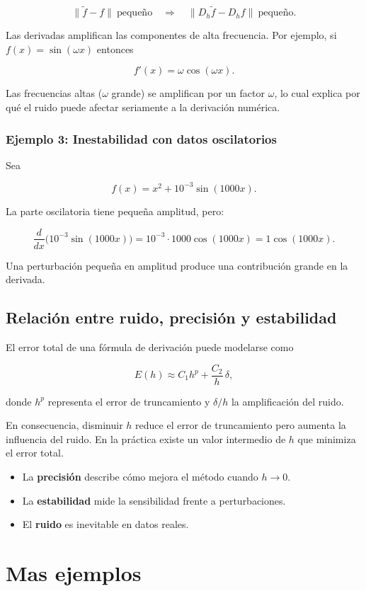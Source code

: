 \documentclass[12pt,a4paper]{article}
\theoremstyle{definition}
\theoremstyle{remark}
\begin{document}
\[
\|\tilde f-f\|\ \text{pequeño}
\quad \Rightarrow \quad
\|D_h\tilde f-D_h f\|\ \text{pequeño}.
\]

Las derivadas amplifican las componentes de alta frecuencia. Por ejemplo,
si $f(x)=\sin(\omega x)$ entonces

\[
f'(x)=\omega\cos(\omega x).
\]

Las frecuencias altas ($\omega$ grande) se amplifican por un factor $\omega$,
lo cual explica por qué el ruido puede afectar seriamente a la derivación
numérica.


\subsubsection*{Ejemplo 3: Inestabilidad con datos oscilatorios}

Sea

\[
f(x)=x^2 + 10^{-3}\sin(1000x).
\]

La parte oscilatoria tiene pequeña amplitud, pero:

\[
\frac{d}{dx}\big(10^{-3}\sin(1000x)\big)
=
10^{-3}\cdot 1000\cos(1000x)
=
1\cos(1000x).
\]

Una perturbación pequeña en amplitud produce una contribución grande en la derivada.

\subsection{Relación entre ruido, precisión y estabilidad}

El error total de una fórmula de derivación puede modelarse como

\[
E(h)\approx C_1 h^p + \frac{C_2}{h}\,\delta,
\]

donde $h^p$ representa el error de truncamiento y $\delta/h$ la amplificación
del ruido.

En consecuencia, disminuir $h$ reduce el error de truncamiento pero aumenta
la influencia del ruido. En la práctica existe un valor intermedio de $h$
que minimiza el error total.

\begin{itemize}
\item La \textbf{precisión} describe cómo mejora el método cuando $h\to0$.
\item La \textbf{estabilidad} mide la sensibilidad frente a perturbaciones.
\item El \textbf{ruido} es inevitable en datos reales.
\end{itemize}


\section{Mas ejemplos}
\end{document}
